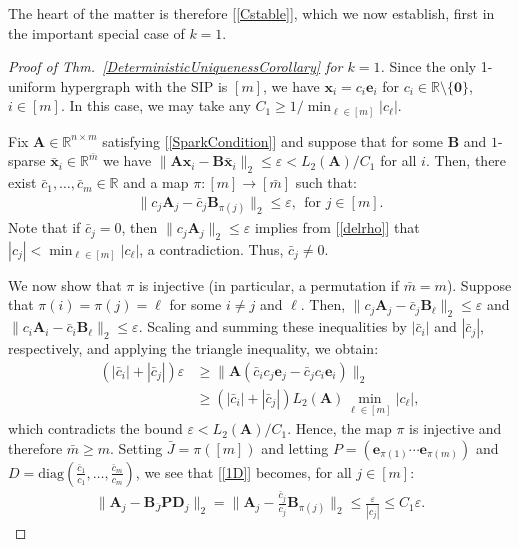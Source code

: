 \documentclass[9pt,twocolumn]{pnas-new}
\renewcommand{\eqref}[1]{\textnormal{[\ref{#1}]}}
\begin{document}
The heart of the matter is therefore \eqref{Cstable}, which we now establish, first in the important special case of $k = 1$.

\begin{proof}[Proof of Thm.~\ref{DeterministicUniquenessCorollary} for $k=1$]
Since the only 1-uniform hypergraph with the SIP is $[m]$, we have $\mathbf{x}_i = c_i \mathbf{e}_i$ for $c_i \in \mathbb{R} \setminus \{\mathbf{0}\}$, $i \in [m]$. In this case, we may take any $C_1 \geq 1/ \min_{\ell \in [m]} |c_{\ell}|$. 

Fix $\mathbf{A} \in \mathbb{R}^{n \times m}$ satisfying \eqref{SparkCondition} and suppose that for some $\mathbf{B}$ and $1$-sparse $\mathbf{\bar x}_i \in \mathbb{R}^{\bar m}$ we have  $\|\mathbf{A}\mathbf{x}_i - \mathbf{B}\mathbf{\bar x}_i\|_2 \leq \varepsilon < L_2(\mathbf{A}) / C_1$ for all $i$. Then, there exist $\bar{c}_1, \ldots, \bar{c}_m \in \mathbb{R}$ and a map $\pi: [m] \to [\bar m]$ such that:
\begin{align}\label{1D}
\|c_j\mathbf{A}_j - \bar{c}_j\mathbf{B}_{\pi(j)}\|_2 \leq \varepsilon,\ \ \text{for $j \in [m]$}.
\end{align} 
Note that if $\bar{c}_j = 0$, then $\|c_j\mathbf{A}_j \|_2 \leq \varepsilon$ implies from \eqref{delrho} that $|c_j| < \min_{\ell \in [m]} | c_\ell |$, a contradiction.  Thus, $\bar{c}_j \neq 0$.

We  now show that $\pi$ is injective (in particular, a permutation if $\bar m = m$). Suppose that $\pi(i) = \pi(j) = \ell$ for some $i \neq j$ and $\ell$. Then, $\|c_{j}\mathbf{A}_{j} - \bar{c}_{j}\mathbf{B}_{\ell}\|_2 \leq \varepsilon$ and $\|c_{i}\mathbf{A}_{i} - \bar{c}_{i} \mathbf{B}_{\ell}\|_2  \leq \varepsilon$. Scaling and summing these inequalities by $|\bar{c}_{i}|$ and $|\bar{c}_{j}|$, respectively, and applying the triangle inequality, we obtain:
\begin{align*}
(|\bar{c}_{i}| + |\bar{c}_{j}|) \varepsilon
&\geq\|\mathbf{A}(\bar{c}_{i}c_{j} \mathbf{e}_{j} - \bar{c}_{j}c_{i}\mathbf{e}_{i})\|_2 \nonumber \\ 
&\geq  \left( |\bar{c}_{i}| + |\bar{c}_{j}| \right) L_2(\mathbf{A}) \min_{\ell \in [m]} |c_\ell |,
\end{align*}
which contradicts the bound $\varepsilon < L_2(\mathbf{A})/C_1$. Hence, the map $\pi$ is injective and therefore $\bar m \geq m$. Setting $\bar J = \pi([m])$ and letting $P = \left( \mathbf{e}_{\pi(1)} \cdots \mathbf{e}_{\pi(m)}\right)$ and $D = \text{diag}(\frac{\bar{c}_1}{c_1},\ldots,\frac{\bar{c}_m}{c_m})$, we see that \eqref{1D} becomes, for all $j \in [m]$:
\begin{align*}
\|\mathbf{A}_j - \mathbf{B}_{\bar J}\mathbf{PD}_j\|_2 
= \|\mathbf{A}_j - \frac{\bar{c}_j}{c_j}\mathbf{B}_{\pi(j)}\|_2 
\leq \frac{\varepsilon}{|c_j|} 
\leq C_1\varepsilon.
\end{align*}
\vspace{-.2 cm}
\end{proof}
\end{document}
